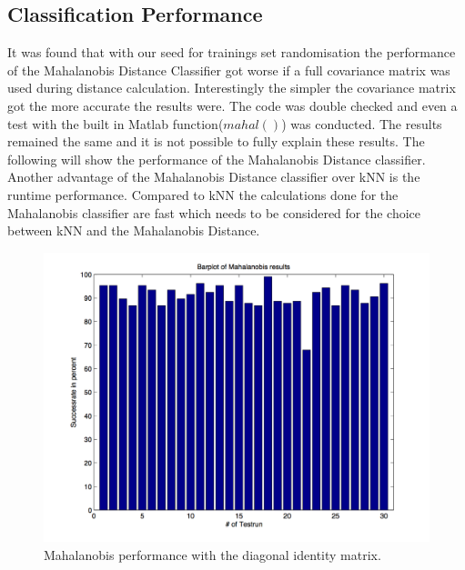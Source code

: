 \documentclass[subfigure,epsfig,fleqn,amssmb,float,caption,ausarbeitung]{scrartcl}
\begin{document}
\subsection{Classification Performance}
\label{sec:MahalanobisPerformance}

It was found that with our seed for trainings set randomisation the performance of the Mahalanobis Distance Classifier got worse if a full covariance matrix was used during distance calculation. Interestingly the simpler the covariance matrix got the more accurate the results were. The code was double checked and even a test with the built in Matlab function($mahal()$) was conducted. The results remained the same and it is not possible to fully explain these results. The following will show the performance of the Mahalanobis Distance classifier. 
Another advantage of the Mahalanobis Distance classifier over kNN is the runtime performance. Compared to kNN the calculations done for the Mahalanobis classifier are fast which needs to be considered for the choice between kNN and the Mahalanobis Distance.
\begin{figure}
	\centering
	\includegraphics[scale=0.75]{img/mahalanobis_results_diag_identity.jpg}
	\caption{Mahalanobis performance with the diagonal identity matrix.}
\end{figure}
\end{document}
